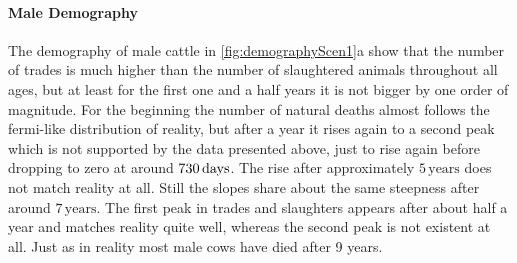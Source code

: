 \paragraph{Male Demography}
The demography of male cattle in \ref{fig:demographyScen1}a show that the number of trades is much higher than the number of slaughtered animals throughout all ages, but at least for the first one and a half years it is not bigger by one order of magnitude. For the beginning the number of natural deaths almost follows the fermi-like distribution of reality, but after a year it rises again to a second peak which is not supported by the data presented above, just to rise again before dropping to zero at around $730\,\text{days}$. 
The rise after approximately $5\,\text{years}$ does not match reality at all. Still the slopes share about the same steepness after around $7\,\text{years}$. The first peak in trades and slaughters appears after about half a year and matches reality quite well, whereas the second peak is not existent at all. Just as in reality most male cows have died after 9 years.
